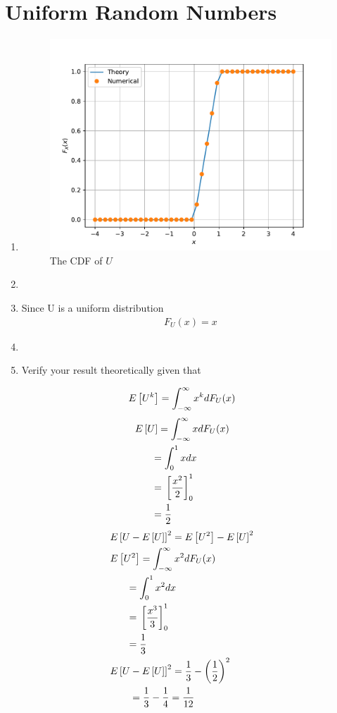\documentclass[journal,12pt,twocolumn]{IEEEtran}
\renewcommand\thesection{\arabic{section}}
\begin{document}
\section{Uniform Random Numbers}
\begin{enumerate}[label=\thesection.\arabic*
,ref=\thesection.\theenumi]
    \item
    \begin{figure}[h]
        \centering
        \includegraphics[width=\columnwidth]{../figs/uni_cdf}
        \caption{The CDF of $U$}\label{fig:uni_cdf}
        \end{figure}
    \item
    \item \solution{}Since U is  a uniform distribution
    \begin{align}
        F_U(x) = x
    \end{align}
    \item
    \item Verify your result theoretically given that
    \end{enumerate}
    \begin{equation}
    E{}\left[U^k\right] = \int_{-\infty}^{\infty}x^k dF_{U}(x)
    \end{equation}
    \begin{align}
        &E{}\left[U\right] = \int_{-\infty}^{\infty}x dF_U(x)\\
        &~~~~~= \int_{0}^{1}x dx\\
        &~~~~~= {}\left[\frac{x^2}{2}\right]^1_0\\
        &~~~~~= \frac{1}{2}
    \end{align}
    \begin{align}
        &E{}\left[U-E{}\left[U\right]\right]^2 = E{}\left[U^2\right] - E{}\left[U\right]^2\\
        &E{}\left[U^2\right] = \int_{-\infty}^{\infty}x^2 dF_U(x)\\
        &~~~~~= \int_{0}^{1}x^2 dx\\
        &~~~~~= {}\left[\frac{x^3}{3}\right]^1_0\\
        &~~~~~= \frac{1}{3}\\
        &E{}\left[U-E{}\left[U\right]\right]^2 =  \frac{1}{3} - \left(\frac{1}{2}\right)^2\\
        &~~~~~~ = \frac{1}{3} - \frac{1}{4}  =\frac{1}{12}
    \end{align}
\end{document}

